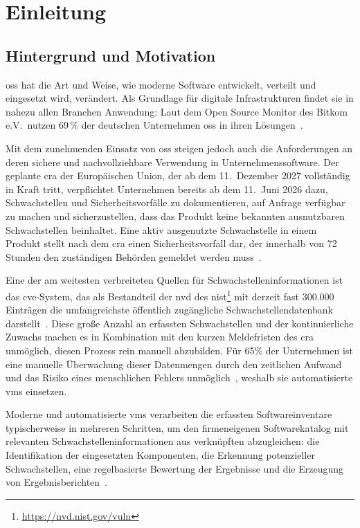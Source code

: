 \chapter{Einleitung}\label{ch:einleitung}


\section{Hintergrund und Motivation}\label{sec:hintergrund-motivation}

\acrfull{oss} hat die Art und Weise, wie moderne Software entwickelt, verteilt und eingesetzt wird, verändert.
Als Grundlage für digitale Infrastrukturen findet sie in nahezu allen Branchen Anwendung:
Laut dem Open Source Monitor des Bitkom e.V.\ nutzen 69\,\% der deutschen Unternehmen \acrshort{oss} in ihren Lösungen\ \autocite{OpenSourceMonitorWintergerst}.

Mit dem zunehmenden Einsatz von \acrshort{oss} steigen jedoch auch die Anforderungen an deren sichere und nachvollziehbare Verwendung in Unternehmenssoftware.
Der geplante \acrfull{cra} der Europäischen Union, der ab dem 11.\ Dezember 2027 vollständig in Kraft tritt,
verpflichtet Unternehmen bereits ab dem 11.\ Juni 2026 dazu, Schwachstellen und Sicherheitsvorfälle zu dokumentieren,
auf Anfrage verfügbar zu machen und sicherzustellen, dass das Produkt keine bekannten ausnutzbaren Schwachstellen beinhaltet.
Eine aktiv ausgenutzte Schwachstelle in einem Produkt stellt nach dem \acrshort{cra} einen Sicherheitsvorfall dar, der innerhalb von 72 Stunden den zuständigen Behörden gemeldet werden muss\ \autocite{eu2024cra}.

Eine der am weitesten verbreiteten Quellen für Schwachstelleninformationen ist das \acrfull{cve}-System, das als Bestandteil der \acrfull{nvd} des \acrfull{nist}\footnote{\url{https://nvd.nist.gov/vuln}} mit derzeit fast 300.000 Einträgen die umfangreichste öffentlich zugängliche Schwachstellendatenbank darstellt\ \autocite{nvd12mai2025dashboard}.
Diese große Anzahl an erfassten Schwachstellen und der kontinuierliche Zuwachs machen es in Kombination mit den kurzen Meldefristen des \acrshort{cra} unmöglich, diesen Prozess rein manuell abzubilden.
Für 65\% der Unternehmen ist eine manuelle Überwachung dieser Datenmengen durch den zeitlichen Aufwand und das Risiko eines menschlichen Fehlers unmöglich\ \autocite{OpenSourceMonitorWintergerst}, weshalb sie automatisierte \acrfull{vms} einsetzen.

Moderne und automatisierte \acrshort{vms} verarbeiten die erfassten Softwareinventare typischerweise in mehreren Schritten, um den firmeneigenen Softwarekatalog mit relevanten Schwachstelleninformationen aus verknüpften  abzugleichen:
die Identifikation der eingesetzten Komponenten, die Erkennung potenzieller Schwachstellen, eine regelbasierte Bewertung der Ergebnisse und die Erzeugung von Ergebnisberichten\ \autocite{Idrissi_Sebai_Faroukhi_Mahouachi_2024}.

